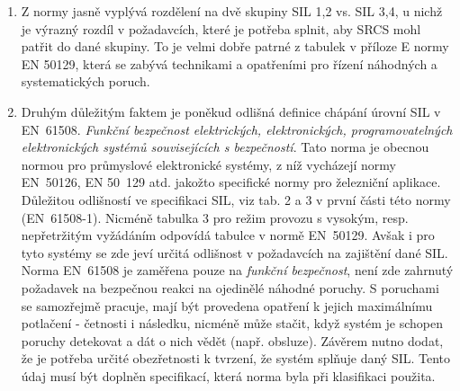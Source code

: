       \begin{enumerate}
        \item Z normy jasně vyplývá rozdělení na dvě skupiny SIL 1,2 vs. SIL 3,4, u nichž je 
              výrazný rozdíl v požadavcích, které je potřeba splnit, aby SRCS mohl patřit 
              do dané skupiny. To je velmi dobře patrné z tabulek v příloze E normy EN 50129, 
              která se zabývá technikami a opatřeními pro řízení náhodných a systematických 
              poruch. 
        \item Druhým důležitým faktem je poněkud odlišná definice chápání úrovní SIL v 
              EN~61508. \emph{Funkční bezpečnost elektrických, elektronických, programovatelných
              elektronických systémů souvisejících s bezpečností}. Tato norma je obecnou normou pro
              průmyslové elektronické systémy, z níž vycházejí normy EN~50126, EN 50~129 atd.
              jakožto specifické normy pro železniční aplikace. Důležitou odlišností ve specifikaci
              SIL, viz tab. 2 a 3 v první části této normy (EN~61508-1). Nicméně tabulka 3 pro
              režim provozu s vysokým, resp. nepřetržitým vyžádáním odpovídá tabulce v normě
              EN~50129. Avšak i pro tyto systémy se zde jeví určitá odlišnost v požadavcích na
              zajištění dané SIL. Norma EN~61508 je zaměřena pouze na \emph{funkční bezpečnost},
              není zde zahrnutý požadavek na bezpečnou reakci na ojedinělé náhodné poruchy. S
              poruchami se samozřejmě pracuje, mají být provedena opatření k jejich maximálnímu
              potlačení - četnosti i následku, nicméně může stačit, když systém je schopen poruchy
              detekovat a dát o nich vědět (např. obsluze). Závěrem nutno dodat, že je potřeba
              určité obezřetnosti k tvrzení, že systém splňuje daný SIL. Tento údaj musí být
              doplněn specifikací, která norma byla při klasifikaci použita.
      \end{enumerate}
       
       
    
    
    
    
    
    
    
    
    
    
    
    
    
    
    
    
    
    
    
    
    
    
    
    
    
    
    
    
    
    
    
    
    
    
    
    
    
    
    
    
    
    
    
    
    
    
    
    